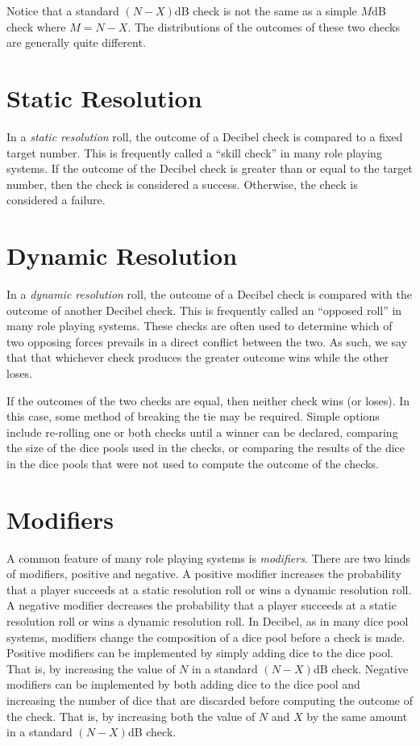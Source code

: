 \documentclass{scrartcl}
\begin{document}
Notice that a standard $(N-X)$dB check is not the same as a simple $M$dB check where $M = N-X$. The distributions of the outcomes of these two checks are generally quite different. 

\newpage

\section{Static Resolution}
In a \emph{static resolution} roll, the outcome of a Decibel check is compared to a fixed target number. This is frequently called a ``skill check'' in many role playing systems.  If the outcome of the Decibel check is greater than or equal to the target number, then the check is considered a success.  Otherwise, the check is considered a failure.

\section{Dynamic Resolution}
In a \emph{dynamic resolution} roll, the outcome of a Decibel check is compared with the outcome of another Decibel check.  This is frequently called an ``opposed roll'' in many role playing systems.  These checks are often used to determine which of two opposing forces prevails in a direct conflict between the two.  As such, we say that that whichever check produces the greater outcome wins while the other loses.

If the outcomes of the two checks are equal, then neither check wins (or loses). In this case, some method of breaking the tie may be required.  Simple options include re-rolling one or both checks until a winner can be declared, comparing the size of the dice pools used in the checks, or comparing the results of the dice in the dice pools that were not used to compute the outcome of the checks.

\section{Modifiers}
A common feature of many role playing systems is \emph{modifiers}. There are two kinds of modifiers, positive and negative.  A positive modifier increases the probability that a player succeeds at a static resolution roll or wins a dynamic resolution roll. A negative modifier decreases the probability that a player succeeds at a static resolution roll or wins a dynamic resolution roll. In Decibel, as in many dice pool systems, modifiers change the composition of a dice pool before a check is made. Positive modifiers can be implemented by simply adding dice to the dice pool. That is, by increasing the value of $N$ in a standard $(N-X)$dB check. Negative modifiers can be implemented by both adding dice to the dice pool and increasing the number of dice that are discarded before computing the outcome of the check.  That is, by increasing both the value of $N$ and $X$ by the same amount in a standard $(N-X)$dB check.
\end{document}
